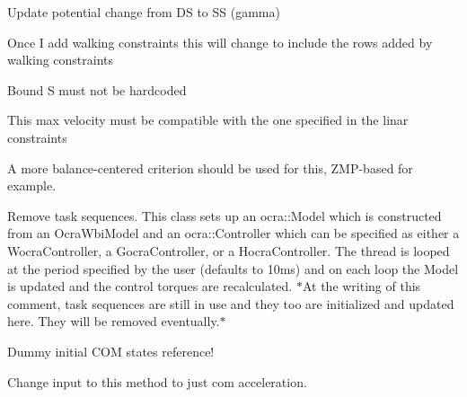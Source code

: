 \begin{DoxyRefList}
\-Update potential change from \-D\-S to \-S\-S (gamma)  
\item[\label{todo__todo000004}%
\hypertarget{todo__todo000004}{}%
\-Member \hyperlink{classMIQPLinearConstraints_a09f79be23a0269104add07a52c52f90f}{\-M\-I\-Q\-P\-Linear\-Constraints\-:\-:\-M\-I\-Q\-P\-Linear\-Constraints} (unsigned int dt, unsigned int \-N)]\-Once \-I add walking constraints this will change to include the rows added by walking constraints  
\item[\label{todo__todo000005}%
\hypertarget{todo__todo000005}{}%
\-Member \hyperlink{classSingleSupport_a78e5b7c89b828d718560cec73c0f6218}{\-Single\-Support\-:\-:build\-Matrix\-Ci} ()]\-Bound \-S must not be hardcoded  
\item[\label{todo__todo000009}%
\hypertarget{todo__todo000009}{}%
\-Member \hyperlink{classStepController_a8f061f201c651d920ca02f7daa07adfe}{\-Step\-Controller\-:\-:initialize} ()]\-This max velocity must be compatible with the one specified in the linar constraints  
\item[\label{todo__todo000002}%
\hypertarget{todo__todo000002}{}%
\-Member \hyperlink{classSteppingDemoClient_ad8fbc186267a47a73bb77e78199f2b8c}{\-Stepping\-Demo\-Client\-:\-:is\-Balanced} ()]\-A more balance-\/centered criterion should be used for this, \-Z\-M\-P-\/based for example.  
\item[\label{todo__todo000001}%
\hypertarget{todo__todo000001}{}%
\-Class \hyperlink{classThread}{\-Thread} ]\-Remove task sequences. \-This class sets up an ocra\-::\-Model which is constructed from an \-Ocra\-Wbi\-Model and an ocra\-::\-Controller which can be specified as either a \-Wocra\-Controller, a \-Gocra\-Controller, or a \-Hocra\-Controller. \-The thread is looped at the period specified by the user (defaults to 10ms) and on each loop the \-Model is updated and the control torques are recalculated. $\ast$\-At the writing of this comment, task sequences are still in use and they too are initialized and updated here. \-They will be removed eventually.$\ast$  
\item[\label{todo__todo000011}%
\hypertarget{todo__todo000011}{}%
\-Member \hyperlink{classWalkingClient_aba6a03fe29a4e947bc6bc0c09a713b2a}{\-Walking\-Client\-:\-:initialize} ()]\-Dummy initial \-C\-O\-M states reference!  
\item[\label{todo__todo000010}%
\hypertarget{todo__todo000010}{}%
\-Member \hyperlink{classWalkingClient_aad39a3836319f9b7258d8eb129776b47}{\-Walking\-Client\-:\-:prepare\-Andset\-Desired\-Co\-M\-Task\-State} (\-Eigen\-::\-Vector\-Xd com\-State, bool do\-Set)]\-Change input to this method to just com acceleration.  

\end{DoxyRefList}
